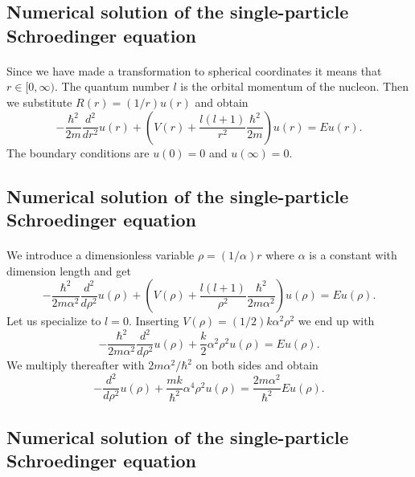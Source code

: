 \documentclass[%
twoside,                 %
final,                   %
10pt]{article}
\begin{document}
\subsection*{Numerical solution of the single-particle Schroedinger equation}

\paragraph{}
Since we have made a transformation to spherical coordinates it means that 
$r\in [0,\infty)$.  
The quantum number
$l$ is the orbital momentum of the nucleon.   Then we substitute $R(r) = (1/r) u(r)$ and obtain
\[
  -\frac{\hbar^2}{2 m} \frac{d^2}{dr^2} u(r) 
       + \left ( V(r) + \frac{l (l + 1)}{r^2}\frac{\hbar^2}{2 m}
                                    \right ) u(r)  = E u(r) .
\]
The boundary conditions are $u(0)=0$ and $u(\infty)=0$.




\subsection*{Numerical solution of the single-particle Schroedinger equation}

\paragraph{}
We introduce a dimensionless variable $\rho = (1/\alpha) r$
where $\alpha$ is a constant with dimension length and get
\[
  -\frac{\hbar^2}{2 m \alpha^2} \frac{d^2}{d\rho^2} u(\rho) 
       + \left ( V(\rho) + \frac{l (l + 1)}{\rho^2}
         \frac{\hbar^2}{2 m\alpha^2} \right ) u(\rho)  = E u(\rho) .
\]
Let us specialize to $l=0$. 
Inserting $V(\rho) = (1/2) k \alpha^2\rho^2$ we end up with
\[
  -\frac{\hbar^2}{2 m \alpha^2} \frac{d^2}{d\rho^2} u(\rho) 
       + \frac{k}{2} \alpha^2\rho^2u(\rho)  = E u(\rho) .
\]
We multiply thereafter with $2m\alpha^2/\hbar^2$ on both sides and obtain
\[
  -\frac{d^2}{d\rho^2} u(\rho) 
       + \frac{mk}{\hbar^2} \alpha^4\rho^2u(\rho)  = \frac{2m\alpha^2}{\hbar^2}E u(\rho) .
\]




\subsection*{Numerical solution of the single-particle Schroedinger equation}
\end{document}
